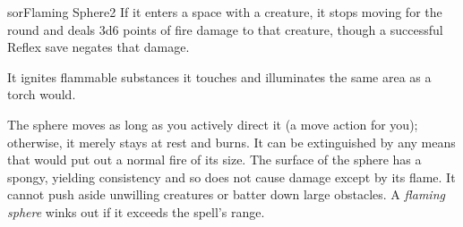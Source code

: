 \begin{spellcard}{sor}{Flaming Sphere}{2}
  If it enters a space with a creature,
  it stops moving for the round and deals 3d6 points of fire damage to that creature,
  though a successful Reflex save negates that damage.

  It ignites flammable substances it touches and illuminates the same area as a torch would.

  The sphere moves as long as you actively direct it (a move action for you);
  otherwise, it merely stays at rest and burns.
  It can be extinguished by any means that would put out a normal fire of its size.
  The surface of the sphere has a spongy, yielding consistency and so does not cause damage except by its flame.
  It cannot push aside unwilling creatures or batter down large obstacles.
  A \emph{flaming sphere} winks out if it exceeds the spell's range.

\end{spellcard}
